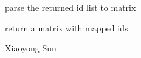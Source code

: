 \begin{Description}\relax
parse the returned id list to matrix
\end{Description}
\begin{Value}
return a matrix with mapped ids
\end{Value}
\begin{Author}\relax
Xiaoyong Sun
\end{Author}

